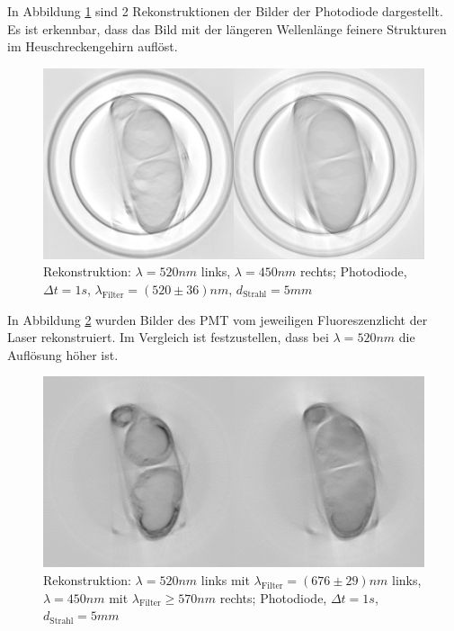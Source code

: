 \begin{minipage}{\linewidth}
In Abbildung \ref{fig:both-pht} sind 2 Rekonstruktionen der Bilder der Photodiode dargestellt.
Es ist erkennbar, dass das Bild mit der längeren Wellenlänge feinere Strukturen im Heuschreckengehirn auflöst.
\begin{figure}[H]
\centering
\includegraphics[width=\linewidth]{IMAGE/2-pht-c.png}
\caption{Rekonstruktion: $\lambda = 520 \si{nm}$ links, $\lambda = 450 \si{nm}$ rechts; Photodiode, $\Delta{t} = 1 \si{s}$, $\lambda_\text{Filter} = (520 \pm 36) \si{nm}$, $d_\text{Strahl} = 5 \si{mm}$}
	\label{fig:both-pht}
\end{figure}

In Abbildung \ref{fig:both-pmt} wurden Bilder des PMT vom jeweiligen Fluoreszenzlicht der Laser rekonstruiert. Im Vergleich ist festzustellen, dass bei $\lambda= 520 \si{nm}$ die Auflösung höher ist.

\begin{figure}[H]
\centering
\includegraphics[width=\linewidth]{IMAGE/2-pmt-c.png}
\caption{Rekonstruktion: $\lambda = 520 \si{nm}$ links mit $\lambda_\text{Filter} = (676 \pm 29) \si{nm}$ links,\\
$\lambda = 450 \si{nm}$ mit $\lambda_\text{Filter} \ge 570 \si{nm}$ rechts; Photodiode, $\Delta{t} = 1 \si{s}$,\\
$d_\text{Strahl} = 5 \si{mm}$}
	\label{fig:both-pmt}
\end{figure}
\end{minipage}


